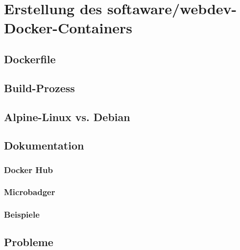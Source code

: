 \chapter{Erstellung des softaware/webdev-Docker-Containers}
\label{cha:implementation}

\section{Dockerfile}
\label{sec:dockerfile}


\section{Build-Prozess}
\label{sec:build-process}


\section{Alpine-Linux vs. Debian}
\label{sec:alpine-vs-debian}


\section{Dokumentation}
\label{sec:documentation}

\subsection{Docker Hub}
\label{sub:dockerhub}
\subsection{Microbadger}
\label{sub:microbadger}
\subsection{Beispiele}
\label{sub:examples}


\section{Probleme}
\label{sec:container-problems}
